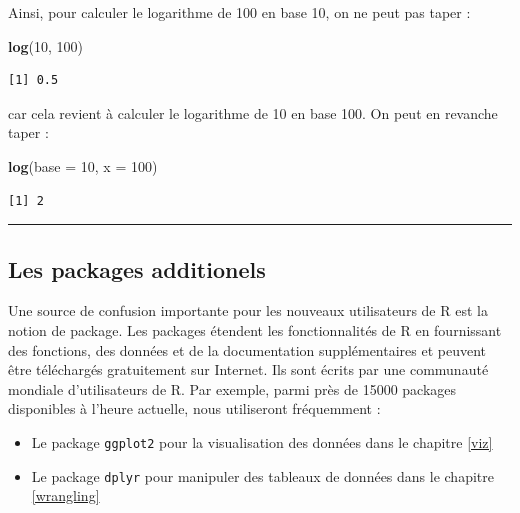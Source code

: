 \documentclass[
  a4paper,
]{article}
\newenvironment{Shaded}{\begin{snugshade}}{\end{snugshade}}
\newcommand{\DataTypeTok}[1]{\textcolor[rgb]{0.00,0.34,0.68}{#1}}
\newcommand{\DecValTok}[1]{\textcolor[rgb]{0.69,0.50,0.00}{#1}}
\newcommand{\KeywordTok}[1]{\textcolor[rgb]{0.12,0.11,0.11}{\textbf{#1}}}
\newcommand{\NormalTok}[1]{\textcolor[rgb]{0.12,0.11,0.11}{#1}}
\providecommand{\tightlist}{%
  \setlength{\itemsep}{0pt}\setlength{\parskip}{0pt}}
\begin{document}
Ainsi, pour calculer le logarithme de 100 en base 10, on ne peut pas taper :

\begin{Shaded}
\begin{Highlighting}[]
\KeywordTok{log}\NormalTok{(}\DecValTok{10}\NormalTok{, }\DecValTok{100}\NormalTok{)}
\end{Highlighting}
\end{Shaded}

\begin{verbatim}
[1] 0.5
\end{verbatim}

car cela revient à calculer le logarithme de 10 en base 100. On peut en revanche taper :

\begin{Shaded}
\begin{Highlighting}[]
\KeywordTok{log}\NormalTok{(}\DataTypeTok{base =} \DecValTok{10}\NormalTok{, }\DataTypeTok{x =} \DecValTok{100}\NormalTok{)}
\end{Highlighting}
\end{Shaded}

\begin{verbatim}
[1] 2
\end{verbatim}

\begin{center}\rule{0.5\linewidth}{0.5pt}\end{center}

\hypertarget{packages}{%
\subsection{Les packages additionels}\label{packages}}

Une source de confusion importante pour les nouveaux utilisateurs de R est la notion de package. Les packages étendent les fonctionnalités de R en fournissant des fonctions, des données et de la documentation supplémentaires et peuvent être téléchargés gratuitement sur Internet. Ils sont écrits par une communauté mondiale d'utilisateurs de R. Par exemple, parmi près de 15000 packages disponibles à l'heure actuelle, nous utiliseront fréquemment :

\begin{itemize}
\tightlist
\item
  Le package \texttt{ggplot2} pour la visualisation des données dans le chapitre \ref{viz}
\item
  Le package \texttt{dplyr} pour manipuler des tableaux de données dans le chapitre \ref{wrangling}
\end{itemize}
\end{document}
